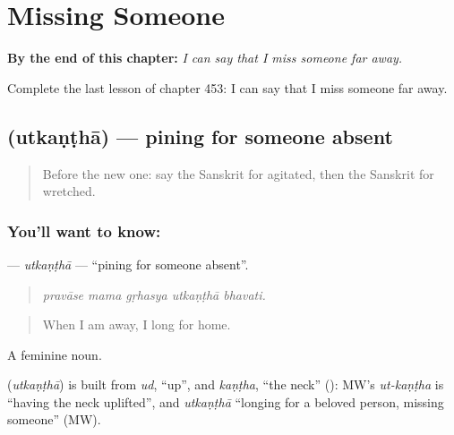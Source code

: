 
\chapter{Missing Someone}
\label{ch:sa-missing-someone}

\begin{chapteropening}
\textbf{By the end of this chapter:} \emph{I can say that I miss someone far away.}

Complete the last lesson of chapter 453: I can say that I miss someone far away.
\end{chapteropening}

\section[\texorpdfstring{\sk{उत्कण्ठा} (utkaṇṭhā)}{उत्कण्ठा (utkaṇṭhā)}]{ (utkaṇṭhā) — pining for someone absent}

\label{lesson:SA-C453-utkantha}



\begin{quote}
Before the new one: say the Sanskrit for agitated, then the Sanskrit for wretched.
\end{quote}

\subsection*{You'll want to know: }
\textbf{} — \emph{utkaṇṭhā} — \textquotedblleft{}pining for someone absent\textquotedblright{}.

\begin{quote}
    
\end{quote}

\begin{quote}
\emph{pravāse mama gṛhasya utkaṇṭhā bhavati.}
\end{quote}

\begin{quote}
When I am away, I long for home.
\end{quote}

A feminine noun.

\begin{cousinweb}
\textbf{} (\emph{utkaṇṭhā}) is built from \emph{ud}, \textquotedblleft{}up\textquotedblright{}, and \emph{kaṇṭha}, \textquotedblleft{}the neck\textquotedblright{} (\textbf{}): MW's \emph{ut-kaṇṭha} is \textquotedblleft{}having the neck uplifted\textquotedblright{}, and \emph{utkaṇṭhā} \textquotedblleft{}longing for a beloved person, missing someone\textquotedblright{} (MW).
\end{cousinweb}

